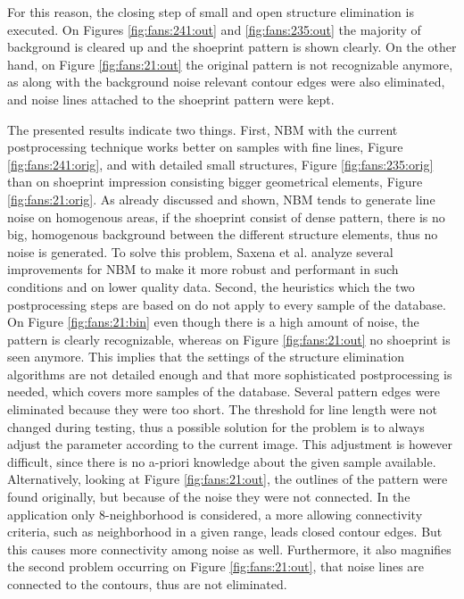\documentclass[draft,final]{vutinfth} %
\begin{document}
For this reason, the closing step of small and open structure elimination is executed.
On Figures \ref{fig:fans:241:out} and \ref{fig:fans:235:out} the majority of background is cleared up and the shoeprint pattern is shown clearly.
On the other hand, on Figure \ref{fig:fans:21:out} the original pattern is not recognizable anymore, as along with the background noise relevant contour edges were also eliminated, and noise lines attached to the shoeprint pattern were kept.
\par
The presented results indicate two things.
First, NBM with the current postprocessing technique works better on samples with fine lines, Figure \ref{fig:fans:241:orig}, and with detailed small structures, Figure \ref{fig:fans:235:orig} than on shoeprint impression consisting bigger geometrical elements, Figure \ref{fig:fans:21:orig}.
As already discussed and shown, NBM tends to generate line noise on homogenous areas, if the shoeprint consist of dense pattern, there is no big, homogenous background between the different structure elements, thus no noise is generated.
To solve this problem, Saxena et al. \cite{saxena2019niblack} analyze several improvements for NBM to make it more robust and performant in such conditions and on lower quality data.
Second, the heuristics which the two postprocessing steps are based on do not apply to every sample of the database.
On Figure  \ref{fig:fans:21:bin} even though there is a high amount of noise, the pattern is clearly recognizable, whereas on Figure \ref{fig:fans:21:out} no shoeprint is seen anymore.
This implies that the settings of the structure elimination algorithms are not detailed enough and that more sophisticated postprocessing is needed, which covers more samples of the database.
Several pattern edges were eliminated because they were too short.
The threshold for line length were not changed during testing, thus a possible solution for the problem is to always adjust the parameter according to the current image.
This adjustment is however difficult, since there is no a-priori knowledge about the given sample available.
Alternatively, looking at Figure  \ref{fig:fans:21:out}, the outlines of the pattern were found originally, but because of the noise they were not connected.
In the application only 8-neighborhood is considered, a more allowing connectivity criteria, such as neighborhood in a given range, leads closed contour edges.
But this causes more connectivity among noise as well.
Furthermore, it also magnifies the second problem occurring on Figure \ref{fig:fans:21:out}, that noise lines are connected to the contours, thus are not eliminated.
\end{document}
